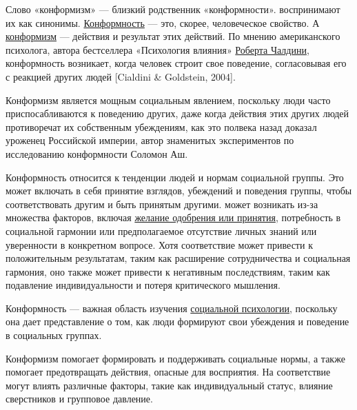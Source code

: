 Слово «конформизм» --- близкий родственник «конформности».  воспринимают их как синонимы. \href{https://4brain.ru/blog/конформность/}{Конформность} --- это, скорее, человеческое свойство. А \href{https://4brain.ru/blog/конформизм/}{конформизм} --- действия и результат этих действий.
По мнению американского психолога, автора бестселлера «Психология влияния» \href{https://4brain.ru/blog/%D0%BF%D1%80%D0%B8%D0%BD%D1%86%D0%B8%D0%BF%D1%8B-%D0%B2%D0%BB%D0%B8%D1%8F%D0%BD%D0%B8%D1%8F-%D1%87%D0%B0%D0%BB%D0%B4%D0%B8%D0%BD%D0%B8/}{Роберта Чалдини}, конформность возникает, когда человек строит свое поведение, согласовывая его с реакцией других людей [Cialdini \& Goldstein, 2004].

Конформизм является мощным социальным явлением, поскольку люди часто приспосабливаются к поведению других, даже когда действия этих других людей противоречат их собственным убеждениям, как это полвека назад доказал уроженец Российской империи, автор знаменитых экспериментов по исследованию конформности Соломон Аш.

Конформность относится к тенденции людей  и нормам социальной группы. Это может включать в себя принятие взглядов, убеждений и поведения группы, чтобы соответствовать другим и быть принятым другими.  может возникать из-за множества факторов, включая \href{https://4brain.ru/blog/%D1%81%D0%BF%D1%83%D1%82%D0%BD%D0%B8%D0%BA%D0%B8-%D0%BD%D0%B5%D1%83%D0%B4%D0%B0%D1%87/}{желание одобрения или принятия}, потребность в социальной гармонии или предполагаемое отсутствие личных знаний или уверенности в конкретном вопросе. Хотя соответствие может привести к положительным результатам, таким как расширение сотрудничества и социальная гармония, оно также может привести к негативным последствиям, таким как подавление индивидуальности и потеря критического мышления.

Конформность --- важная область изучения \href{https://4brain.ru/psy/socialnaja-psihologija.php}{социальной психологии}, поскольку она дает представление о том, как люди формируют свои убеждения и поведение в социальных группах.

Конформизм помогает формировать и поддерживать социальные нормы, а также помогает предотвращать действия, опасные для восприятия. На соответствие могут влиять различные факторы, такие как индивидуальный статус, влияние сверстников и групповое давление.

